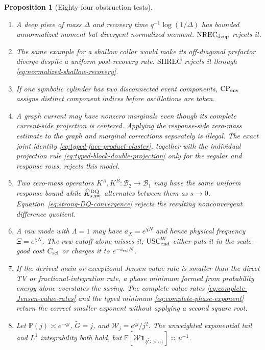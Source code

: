 \documentclass[11pt]{article}
\newtheorem{proposition}[theorem]{Proposition}
\newcommand{\cB}{\mathcal B}
\newcommand{\one}{\mathbf 1}
\begin{document}
\begin{proposition}[Eighty-four obstruction tests]
\begin{enumerate}[label=\textup{(T\arabic*)}]
      the latter and never infers it from signed TV.
\item A deep piece of mass $\Delta$ and recovery time
      $q^{-1}\log(1/\Delta)$ has bounded unnormalized moment but divergent
      normalized moment.  $\mathrm{NREC}_{\rm deep}$ rejects it.
\item The same example for a shallow collar would make its off-diagonal
      prefactor diverge despite a uniform post-recovery rate.
      $\mathrm{SHREC}$ rejects it through
      \eqref{eq:normalized-shallow-recovery}.
\item If one symbolic cylinder has two disconnected event components,
      $\mathrm{CP}_{\rm env}$ assigns distinct component indices before
      oscillations are taken.
\item A graph current may have nonzero marginals even though its complete
      current-side projection is centered.  Applying the response-side
      zero-mass estimate to the graph and marginal corrections separately is
      illegal.  The exact joint identity
      \eqref{eq:typed-face-product-cluster}, together with the individual
      projection rule \eqref{eq:typed-block-double-projection} only for the
      regular and response rows, rejects this model.
\item Two zero-mass operators $K^A,K^B:\cB_2\to\cB_1$ may have the same
      uniform response bound while
      $\widehat K_{s,\rm sw}^{\rm DQ}$ alternates between them as $s\to0$.
      Equation~\eqref{eq:strong-DQ-convergence} rejects the resulting
      nonconvergent difference quotient.
\item A raw mode with $\Lambda=1$ may have $a_X=e^{\chi N}$ and hence
      physical frequency $\Xi=e^{\chi N}$.  The raw cutoff alone misses it;
      $\mathrm{USC}_{\rm end}^{W}$ either puts it in the scale-good cost
      $C_{\rm scl}$ or charges it to $e^{-c_{\rm scl}N}$.
\item If the derived main or exceptional Jensen value rate is smaller than
      the direct TV or fractional-integration rate, a phase minimum formed
      from probability energy alone overstates the saving.  The complete
      value rates \eqref{eq:complete-Jensen-value-rates} and the typed
      minimum \eqref{eq:complete-phase-exponent} return the correct smaller
      exponent without applying a second square root.
\item Let $\mathbb P(j)\asymp e^{-qj}$,
      $\widetilde G=j$, and $\mathscr W_j=e^{qj}/j^2$.  The unweighted
      exponential tail and $L^1$ integrability both hold, but
      $\mathbb E[\mathscr W\one_{\{\widetilde G>u\}}]\asymp u^{-1}$.

\end{enumerate}
\end{proposition}
\end{document}
